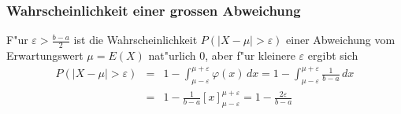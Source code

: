 \subsubsection{Wahrscheinlichkeit einer grossen Abweichung}
{\small
F"ur $\varepsilon>\frac{b-a}2$ ist die Wahrscheinlichkeit
$P(|X-\mu|>\varepsilon)$
einer Abweichung vom Erwartungswert $\mu=E(X)$ nat"urlich $0$,
aber f"ur kleinere $\varepsilon$ ergibt sich
\begin{eqnarray*}
P(|X-\mu|>\varepsilon)
&=&1-\int_{\mu-\varepsilon}^{\mu+\varepsilon}\varphi(x)\,dx
=1-\int_{\mu-\varepsilon}^{\mu+\varepsilon}\frac{1}{b-a}\,dx\\
&=&1-\frac1{b-a}\left[x\right]_{\mu-\varepsilon}^{\mu+\varepsilon}=1-\frac{2\varepsilon}{b-a}
\end{eqnarray*}
}
